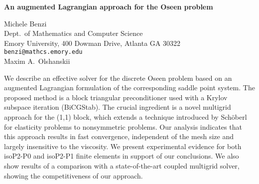 \documentclass{report}
\begin{document}

\begin{center}
{\large
{\bf An augmented Lagrangian approach for the Oseen problem}}

	Michele Benzi \\
	Dept.~of Mathematics and Computer Science \\
	Emory University, 400 Dowman Drive, Atlanta GA 30322 \\
	{\tt benzi@mathcs.emory.edu} \\
	Maxim A.~Olshanskii
\end{center}
We describe an effective solver for the discrete Oseen
problem based on an augmented Lagrangian formulation of the
corresponding saddle point system. The proposed method is a
block triangular preconditioner used with a Krylov subspace
iteration (BiCGStab). The crucial ingredient is a novel
multigrid approach for the (1,1) block, which extends a
technique introduced by Sch\"oberl for elasticity problems
to nonsymmetric problems. Our analysis indicates that this
approach results in fast convergence, independent of the
mesh size and largely insensitive to the viscosity. We
present experimental evidence for both isoP2-P0 and isoP2-P1
finite elements in support of our conclusions. We also show
results of a comparison with a state-of-the-art coupled
multigrid solver, showing the competitiveness of our
approach.




\end{document}
